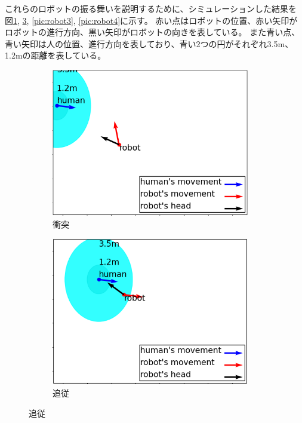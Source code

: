 \documentclass{kuisthesis}
\begin{document}
\begin{itemize}
  \quad これらのロボットの振る舞いを説明するために、シミュレーションした結果を
  図\ref{pic:robot1}, \ref{pic:robot2}, \ref{pic:robot3}, \ref{pic:robot4}に示す。
  赤い点はロボットの位置、赤い矢印がロボットの進行方向、黒い矢印がロボットの向きを表している。
  また青い点、青い矢印は人の位置、進行方向を表しており、青い2つの円がそれぞれ3.5m、1.2mの距離を表している。
\begin{figure}[htb]
  \begin{subfigure}{0.5\textwidth}
    \includegraphics[width=0.95\textwidth]{img/simulation1.png}
    \caption{衝突}
    \label{pic:robot1}
  \end{subfigure}
  \begin{subfigure}{0.5\textwidth}
    \includegraphics[width=0.95\textwidth]{img/simulation2.png}
    \caption{追従}
    \label{pic:robot2}

\end{subfigure}
\end{figure}
\end{itemize}
\end{document}
